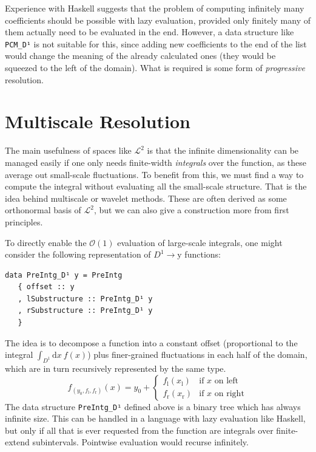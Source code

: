 \documentclass[sigplan,screen]{acmart}
\theoremstyle{acmplain}
\theoremstyle{acmdefinition}
\begin{document}
Experience with Haskell suggests that the problem of computing infinitely many coefficients should be possible with lazy evaluation, provided only finitely many of them actually need to be evaluated in the end.
However, a data structure like \lstinline`PCM_D¹` is not suitable for this, since adding new coefficients to the end of the list would change the meaning of the already calculated ones (they would be squeezed to the left of the domain).
What is required is some form of \emph{progressive} resolution.

\section{Multiscale Resolution}\label{mulScaleResoIntro}
The main usefulness of spaces like $\mathcal{L}^2$ is that the infinite dimensionality can be managed easily if one only needs finite-width \emph{integrals} over the function, as these average out small-scale fluctuations.
To benefit from this, we must find a way to compute the integral without evaluating all the small-scale structure.
That is the idea behind multiscale or wavelet methods.
These are often derived as some orthonormal basis of $\mathcal{L}^2$, but we can also give a construction more from first principles.

To directly enable the $\mathcal{O}(1)$ evaluation of large-scale integrals, one might consider the following representation of $D^1\to \mathrm{y}$ functions:
\begin{lstlisting}
data PreIntg_D¹ y = PreIntg
   { offset :: y
   , lSubstructure :: PreIntg_D¹ y
   , rSubstructure :: PreIntg_D¹ y
   }
\end{lstlisting}
The idea is to decompose a function into a constant offset (proportional to the integral $\int_{D^1}\!\mathrm{d}x\:f(x)$) plus finer-grained fluctuations in each half of the domain, which are in turn recursively represented by the same type.
\[
  f_{(y_0,f_\mathrm{l},f_\mathrm{r})}(x)
      = y_0 + \begin{cases}
                 f_\mathrm{l}(x_\mathrm{l}) & \text{if $x$ on left}
              \\ f_\mathrm{r}(x_\mathrm{r}) & \text{if $x$ on right}
              \end{cases}
\]
The data structure \lstinline`PreIntg_D¹` defined above is a binary tree which has always infinite size.
This can be handled in a language with lazy evaluation like Haskell,
but only if all that is ever requested from the function are integrals over finite-extend subintervals.
Pointwise evaluation would recurse infinitely.
\end{document}
